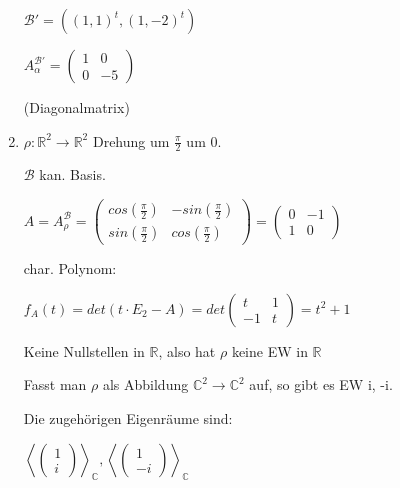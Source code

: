 \documentclass[a4paper, openany]{book}
\begin{document}
\begin{enumerate}[label=(\alph*)]
          \par \medskip

          $\mathcal{B'} = ((1,1)^t, (1,-2)^t)$

          $A_{\alpha}^{\mathcal{B'}} = \begin{pmatrix}1 & 0 \\  0 & -5 \end{pmatrix}$

          (Diagonalmatrix)

          \item $\rho : \mathbb{R}^2 \rightarrow \mathbb{R}^2$ Drehung um $\frac{\pi}{2}$ um 0. 

          $\mathcal{B}$ kan. Basis.

          $A = A_{\rho}^{\mathcal{B}} = \begin{pmatrix}cos(\frac{\pi}{2}) & - sin(\frac{\pi}{2}) \\ sin(\frac{\pi}{2}) & cos(\frac{\pi}{2}) \end{pmatrix} = \begin{pmatrix}0 & -1 \\ 1 & 0 \end{pmatrix}$

          char. Polynom:

          $f_A(t) = det(t \cdot E_2 - A) = det \begin{pmatrix}t & 1 \\ -1 & t \end{pmatrix} = t^2 + 1$

          Keine Nullstellen in $\mathbb{R}$, also hat $\rho$ keine EW in $\mathbb{R}$

          \par \medskip

          \par \medskip

          Fasst man $\rho$ als Abbildung $\mathbb{C}^2 \rightarrow \mathbb{C}^2$ auf, so gibt es EW i, -i.

          \par \medskip

          Die zugehörigen Eigenräume sind:

          $\left \langle \begin{pmatrix}1 \\ i \end{pmatrix} \right \rangle_{\mathbb{C}}, \left \langle \begin{pmatrix}1 \\ -i \end{pmatrix} \right \rangle_{\mathbb{C}}$
        \end{enumerate}
\end{document}
